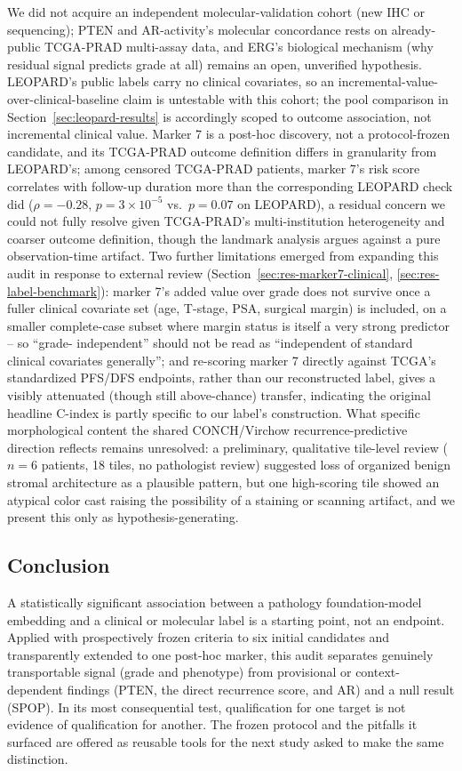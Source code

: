 We did not acquire an independent molecular-validation cohort (new IHC or sequencing);
PTEN and AR-activity's molecular concordance rests on already-public TCGA-PRAD multi-assay
data, and ERG's biological mechanism (why residual signal predicts grade at all) remains an
open, unverified hypothesis. LEOPARD's public labels carry no clinical covariates, so an
incremental-value-over-clinical-baseline claim is untestable with this cohort; the pool
comparison in Section~\ref{sec:leopard-results} is accordingly scoped to outcome association,
not incremental clinical value. Marker 7 is a post-hoc discovery, not a protocol-frozen
candidate, and its TCGA-PRAD outcome definition differs in granularity from LEOPARD's; among
censored TCGA-PRAD patients, marker 7's risk score correlates with follow-up duration more
than the corresponding LEOPARD check did ($\rho=-0.28$, $p=3\times10^{-5}$ vs.\ $p=0.07$ on
LEOPARD), a residual concern we could not fully resolve given TCGA-PRAD's multi-institution
heterogeneity and coarser outcome definition, though the landmark analysis argues against a
pure observation-time artifact. Two further limitations emerged from expanding this audit in
response to external review (Section~\ref{sec:res-marker7-clinical},
\ref{sec:res-label-benchmark}): marker 7's added value over grade does not survive once a
fuller clinical covariate set (age, T-stage, PSA, surgical margin) is included, on a smaller
complete-case subset where margin status is itself a very strong predictor -- so ``grade-
independent'' should not be read as ``independent of standard clinical covariates generally'';
and re-scoring marker 7 directly against TCGA's standardized PFS/DFS endpoints, rather than our
reconstructed label, gives a visibly attenuated (though still above-chance) transfer, indicating
the original headline C-index is partly specific to our label's construction. What specific
morphological content the shared CONCH/Virchow
recurrence-predictive direction reflects remains unresolved: a preliminary, qualitative
tile-level review ($n=6$ patients, 18 tiles, no pathologist review) suggested loss of organized
benign stromal architecture as a plausible pattern, but one high-scoring tile showed an
atypical color cast raising the possibility of a staining or scanning artifact, and we present
this only as hypothesis-generating.

\subsection{Conclusion}

A statistically significant association between a pathology foundation-model embedding and a
clinical or molecular label is a starting point, not an endpoint. Applied with prospectively
frozen criteria to six initial candidates and transparently extended to one post-hoc marker,
this audit separates genuinely transportable signal (grade and phenotype) from provisional
or context-dependent findings (PTEN, the direct recurrence score, and AR) and a null result
(SPOP). In its most consequential test, qualification for one target is not evidence of
qualification for another. The frozen protocol and the pitfalls it
surfaced are offered as reusable tools for the next study asked to make the same distinction.

